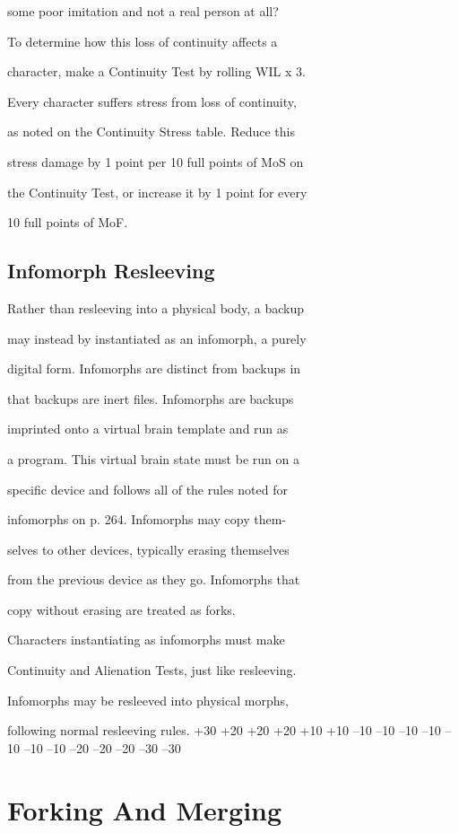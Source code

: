 some poor imitation and not a real person at all?

To determine how this loss of continuity affects a 

character, make a Continuity Test by rolling WIL x 3. 

Every character suffers stress from loss of continuity, 

as noted on the Continuity Stress table. Reduce this 

stress damage by 1 point per 10 full points of MoS on 

the Continuity Test, or increase it by 1 point for every 

10 full points of MoF.

\subsection{Infomorph Resleeving}


Rather than resleeving into a physical body, a backup 

may instead by instantiated as an infomorph, a purely 

digital form. Infomorphs are distinct from backups in 

that backups are inert files. Infomorphs are backups 

imprinted onto a virtual brain template and run as 

a program. This virtual brain state must be run on a 

specific device and follows all of the rules noted for 

infomorphs on p. 264. Infomorphs may copy them-

selves to other devices, typically erasing themselves 

from the previous device as they go. Infomorphs that 

copy without erasing are treated as forks.

Characters instantiating as infomorphs must make 

Continuity and Alienation Tests, just like resleeving.

Infomorphs may be resleeved into physical morphs, 

following normal resleeving rules.
+30
+20
+20
+20
+10
+10
–10
–10
–10
–10
–10
–10
–10
–20
–20
–20
–30
–30

\section{Forking And Merging}


